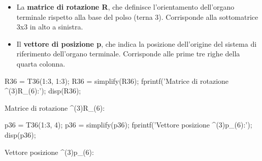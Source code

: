 \documentclass[11pt, a4paper]{article}
\begin{document}
\begin{itemize}
\setlength{\itemsep}{-1ex}
   \item{\begin{flushleft} La \textbf{matrice di rotazione R}, che definisce l'orientamento dell'organo terminale rispetto alla base del polso (terna 3). Corrisponde alla sottomatrice 3x3 in alto a sinistra. \end{flushleft}}
   \item{\begin{flushleft} Il \textbf{vettore di posizione p}, che indica la posizione dell'origine del sistema di riferimento dell'organo terminale. Corrisponde alle prime tre righe della quarta colonna. \end{flushleft}}
\end{itemize}

\begin{matlabcode}
R36 = T36(1:3, 1:3);
R36 = simplify(R36);
fprintf('Matrice di rotazione ^(3)R_(6):\n');
disp(R36);
\end{matlabcode}
\begin{matlaboutput}
Matrice di rotazione ^(3)R_(6):
\end{matlaboutput}

\begin{matlabcode}
p36 = T36(1:3, 4);
p36 = simplify(p36);
fprintf('Vettore posizione ^(3)p_(6):\n');
disp(p36);
\end{matlabcode}
\begin{matlaboutput}
Vettore posizione ^(3)p_(6):
\end{matlaboutput}
\end{document}
